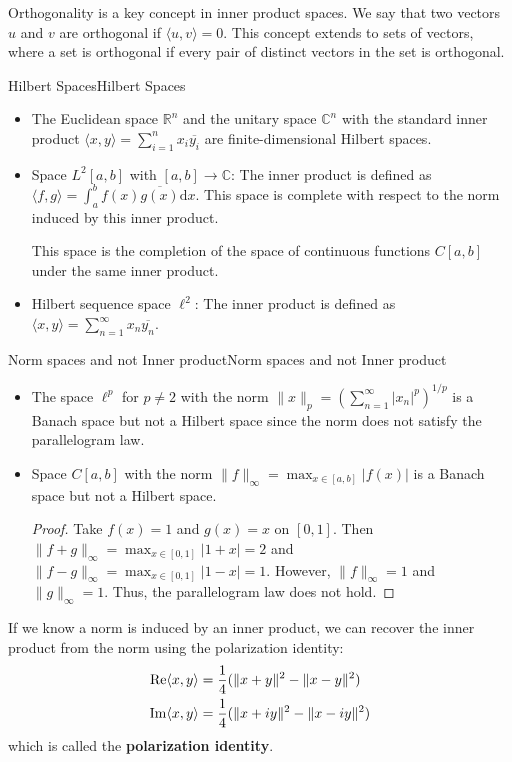 \documentclass[../main.tex]{subfiles}
\begin{document}
Orthogonality is a key concept in inner product spaces. We say that two vectors $u$ and $v$ are orthogonal if $\langle u, v \rangle = 0$. This concept extends to sets of vectors, where a set is orthogonal if every pair of distinct vectors in the set is orthogonal.

\begin{example}{Hilbert Spaces}{Hilbert Spaces}
	\begin{itemize}
		\item The Euclidean space $\mathbb{R}^n$ and the unitary space $\mathbb{C}^n$ with the standard inner product $\langle x, y \rangle = \sum_{i=1}^n x_i \overline{y_i}$ are finite-dimensional Hilbert spaces.
		\item Space $L^2[a,b]$ with $[a,b] \rightarrow \mathbb{C}$: The inner product is defined as $\langle f, g \rangle = \int_a^b f(x) \overline{g(x)} \mathrm{d} x$. This space is complete with respect to the norm induced by this inner product.

			This space is the completion of the space of continuous functions $C[a,b]$ under the same inner product.
		\item Hilbert sequence space $\ell^2$: The inner product is defined as $\langle x, y \rangle = \sum_{n=1}^\infty x_n \overline{y_n}$.
	\end{itemize}
\end{example}

\begin{example}{Norm spaces and not Inner product}{Norm spaces and not Inner product}
	\begin{itemize}
		\item The space $\ell^p$ for $p\neq 2$ with the norm $\|x\|_p = \left(\sum_{n=1}^\infty |x_n|^p\right)^{1/p}$ is a Banach space but not a Hilbert space since the norm does not satisfy the parallelogram law.
		\item Space $C[a,b]$ with the norm $\|f\|_\infty = \max_{x \in [a,b]} |f(x)|$ is a Banach space but not a Hilbert space.
			\begin{proof}
				Take $f(x) = 1$ and $g(x) = x$ on $[0,1]$. Then $\|f+g\|_\infty = \max_{x \in [0,1]} |1+x| = 2$ and $\|f-g\|_\infty = \max_{x \in [0,1]} |1-x| = 1$. However, $\|f\|_\infty = 1$ and $\|g\|_\infty = 1$. Thus, the parallelogram law does not hold.
			\end{proof}
	\end{itemize}
\end{example}

If we know a norm is induced by an inner product, we can recover the inner product from the norm using the polarization identity:
\begin{equation}
	\begin{aligned}
		\operatorname{Re} \langle x, y \rangle &= \frac{1}{4}(\|x+y\|^2 - \|x-y\|^2)\\
		\operatorname{Im} \langle x, y \rangle &= \frac{1}{4}(\|x+iy\|^2 - \|x-iy\|^2)\\
	\end{aligned}
\end{equation}
which is called the \textbf{polarization identity}.
\end{document}
